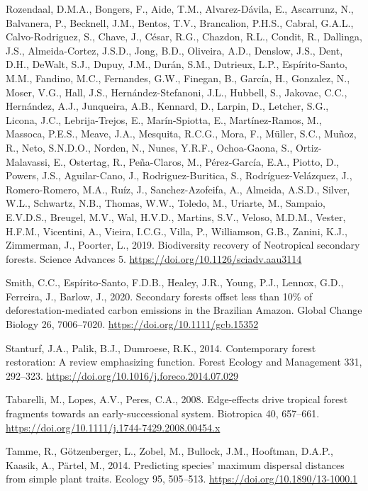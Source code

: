 \documentclass[
  12pt,
]{article}
\newlength{\cslhangindent}
\newlength{\cslentryspacingunit} %
\newenvironment{CSLReferences}[2] %
 {%
  \setlength{\parindent}{0pt}
  \ifodd #1
  \let\oldpar\par
  \def\par{\hangindent=\cslhangindent\oldpar}
  \fi
  \setlength{\parskip}{#2\cslentryspacingunit}
 }%
 {}
\begin{document}
\begin{CSLReferences}{1}{0}
\leavevmode{}%
Rozendaal, D.M.A., Bongers, F., Aide, T.M., Alvarez-Dávila, E., Ascarrunz, N., Balvanera, P., Becknell, J.M., Bentos, T.V., Brancalion, P.H.S., Cabral, G.A.L., Calvo-Rodriguez, S., Chave, J., César, R.G., Chazdon, R.L., Condit, R., Dallinga, J.S., Almeida-Cortez, J.S.D., Jong, B.D., Oliveira, A.D., Denslow, J.S., Dent, D.H., DeWalt, S.J., Dupuy, J.M., Durán, S.M., Dutrieux, L.P., Espírito-Santo, M.M., Fandino, M.C., Fernandes, G.W., Finegan, B., García, H., Gonzalez, N., Moser, V.G., Hall, J.S., Hernández-Stefanoni, J.L., Hubbell, S., Jakovac, C.C., Hernández, A.J., Junqueira, A.B., Kennard, D., Larpin, D., Letcher, S.G., Licona, J.C., Lebrija-Trejos, E., Marín-Spiotta, E., Martínez-Ramos, M., Massoca, P.E.S., Meave, J.A., Mesquita, R.C.G., Mora, F., Müller, S.C., Muñoz, R., Neto, S.N.D.O., Norden, N., Nunes, Y.R.F., Ochoa-Gaona, S., Ortiz-Malavassi, E., Ostertag, R., Peña-Claros, M., Pérez-García, E.A., Piotto, D., Powers, J.S., Aguilar-Cano, J., Rodriguez-Buritica, S., Rodríguez-Velázquez, J., Romero-Romero, M.A., Ruíz, J., Sanchez-Azofeifa, A., Almeida, A.S.D., Silver, W.L., Schwartz, N.B., Thomas, W.W., Toledo, M., Uriarte, M., Sampaio, E.V.D.S., Breugel, M.V., Wal, H.V.D., Martins, S.V., Veloso, M.D.M., Vester, H.F.M., Vicentini, A., Vieira, I.C.G., Villa, P., Williamson, G.B., Zanini, K.J., Zimmerman, J., Poorter, L., 2019. Biodiversity recovery of {Neotropical} secondary forests. Science Advances 5. \url{https://doi.org/10.1126/sciadv.aau3114}

\leavevmode{}%
Smith, C.C., Espírito-Santo, F.D.B., Healey, J.R., Young, P.J., Lennox, G.D., Ferreira, J., Barlow, J., 2020. Secondary forests offset less than 10\% of deforestation-mediated carbon emissions in the {Brazilian Amazon}. Global Change Biology 26, 7006--7020. \url{https://doi.org/10.1111/gcb.15352}

\leavevmode{}%
Stanturf, J.A., Palik, B.J., Dumroese, R.K., 2014. Contemporary forest restoration: {A} review emphasizing function. Forest Ecology and Management 331, 292--323. \url{https://doi.org/10.1016/j.foreco.2014.07.029}

\leavevmode{}%
Tabarelli, M., Lopes, A.V., Peres, C.A., 2008. Edge-effects drive tropical forest fragments towards an early-successional system. Biotropica 40, 657--661. \url{https://doi.org/10.1111/j.1744-7429.2008.00454.x}

\leavevmode{}%
Tamme, R., Götzenberger, L., Zobel, M., Bullock, J.M., Hooftman, D.A.P., Kaasik, A., Pärtel, M., 2014. Predicting species' maximum dispersal distances from simple plant traits. Ecology 95, 505--513. \url{https://doi.org/10.1890/13-1000.1}


\end{CSLReferences}
\end{document}
